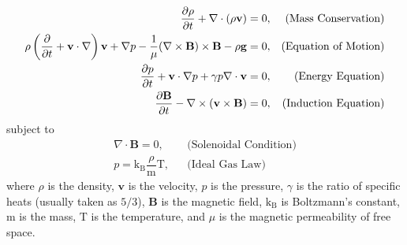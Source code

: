 \documentclass[a4paper,12pt,fourier,authoryear,custommargin]{Classes/PhDThesisPSnPDF}
\renewcommand{\vec}{\mathbf}
\providecommand{\DIFaddtex}[1]{{\protect\color{blue}\uwave{#1}}} %
\providecommand{\DIFaddbegin}{} %
\providecommand{\DIFaddend}{} %
\providecommand{\DIFdelbegin}{} %
\providecommand{\DIFdelend}{} %
\providecommand{\DIFadd}[1]{\texorpdfstring{\DIFaddtex{#1}}{#1}} %
\begin{document}
\begin{align}                                                  
    \dfrac{\partial \rho }{\partial t} + \nabla \cdot (\rho \vec{v}) = 0,
    &&\text{(Mass Conservation)}\label{eq:imhd_mass}\\
    \rho  \condev\vec{v} + \nabla p - \dfrac{1}{\mu}(\nabla \times \vec{B}) \times \vec{B} - \rho \vec{g} = 0,
    &&\text{(Equation of Motion)}\label{eq:imhd_motion}\\
    \frac{\partial p}{\partial t} + \vec{v}\cdot\nabla p + \gamma p \nabla \cdot \vec{v}  = 0,
    &&\text{(Energy Equation)}\label{eq:imhd_equation}\\
    \DIFdelbegin %
\DIFdelend \DIFaddbegin \dfrac{\partial \vec{B}}{\partial t} \DIFaddend - \nabla \times (\vec{v} \times \vec{B}) = 0,
    &&\text{(Induction Equation)}\label{eq:imhd_induction}
\end{align}
subject to
\begin{align}
    \nabla \cdot \vec{B} = 0,
    &&\text{(Solenoidal Condition)}\\
    p = \mathrm{k_B} \dfrac{\rho}{\mathrm{m}} \mathrm{T},
    &&\text{(Ideal Gas Law)}                    
\end{align}
where $\rho$ is the density, $\vec{v}$ is the velocity, $p$ is the pressure, $\gamma$ is the ratio of specific heats (usually taken as $5/3$), $\vec{B}$ is the magnetic field, $\mathrm{k_B}$ is Boltzmann's constant, $\mathrm{m}$ is the mass, $\mathrm{T}$ is the temperature, and $\mu$ is the magnetic permeability of free space\DIFaddbegin \DIFadd{~}\DIFaddend \citep{goedbloed2004}.
\end{document}
